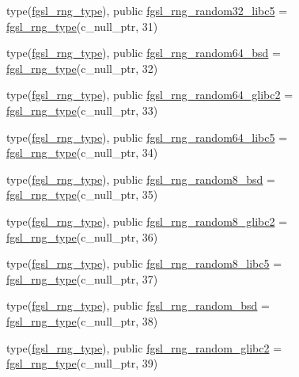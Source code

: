 \begin{DoxyCompactItemize}
type(\hyperlink{structfgsl_1_1fgsl__rng__type}{fgsl\-\_\-rng\-\_\-type}), public \hyperlink{classfgsl_a85c8b85216d7705c54a071e06a65d871}{fgsl\-\_\-rng\-\_\-random32\-\_\-libc5} = \hyperlink{structfgsl_1_1fgsl__rng__type}{fgsl\-\_\-rng\-\_\-type}(c\-\_\-null\-\_\-ptr, 31)
\item 
type(\hyperlink{structfgsl_1_1fgsl__rng__type}{fgsl\-\_\-rng\-\_\-type}), public \hyperlink{classfgsl_a4f1fadb8ae8e69bc97fa0ce10b8c2669}{fgsl\-\_\-rng\-\_\-random64\-\_\-bsd} = \hyperlink{structfgsl_1_1fgsl__rng__type}{fgsl\-\_\-rng\-\_\-type}(c\-\_\-null\-\_\-ptr, 32)
\item 
type(\hyperlink{structfgsl_1_1fgsl__rng__type}{fgsl\-\_\-rng\-\_\-type}), public \hyperlink{classfgsl_afa30a9f9486fc4a3ebc5c98fdf7c2734}{fgsl\-\_\-rng\-\_\-random64\-\_\-glibc2} = \hyperlink{structfgsl_1_1fgsl__rng__type}{fgsl\-\_\-rng\-\_\-type}(c\-\_\-null\-\_\-ptr, 33)
\item 
type(\hyperlink{structfgsl_1_1fgsl__rng__type}{fgsl\-\_\-rng\-\_\-type}), public \hyperlink{classfgsl_a5d485fce442bdf380a13906f23f519cb}{fgsl\-\_\-rng\-\_\-random64\-\_\-libc5} = \hyperlink{structfgsl_1_1fgsl__rng__type}{fgsl\-\_\-rng\-\_\-type}(c\-\_\-null\-\_\-ptr, 34)
\item 
type(\hyperlink{structfgsl_1_1fgsl__rng__type}{fgsl\-\_\-rng\-\_\-type}), public \hyperlink{classfgsl_a03a999d95485529c23b1eeb38284dd6a}{fgsl\-\_\-rng\-\_\-random8\-\_\-bsd} = \hyperlink{structfgsl_1_1fgsl__rng__type}{fgsl\-\_\-rng\-\_\-type}(c\-\_\-null\-\_\-ptr, 35)
\item 
type(\hyperlink{structfgsl_1_1fgsl__rng__type}{fgsl\-\_\-rng\-\_\-type}), public \hyperlink{classfgsl_a6028caefc0e3a940d1ee57801f7fd438}{fgsl\-\_\-rng\-\_\-random8\-\_\-glibc2} = \hyperlink{structfgsl_1_1fgsl__rng__type}{fgsl\-\_\-rng\-\_\-type}(c\-\_\-null\-\_\-ptr, 36)
\item 
type(\hyperlink{structfgsl_1_1fgsl__rng__type}{fgsl\-\_\-rng\-\_\-type}), public \hyperlink{classfgsl_a2cce36d84f84109ec9e54bd0d252bbb3}{fgsl\-\_\-rng\-\_\-random8\-\_\-libc5} = \hyperlink{structfgsl_1_1fgsl__rng__type}{fgsl\-\_\-rng\-\_\-type}(c\-\_\-null\-\_\-ptr, 37)
\item 
type(\hyperlink{structfgsl_1_1fgsl__rng__type}{fgsl\-\_\-rng\-\_\-type}), public \hyperlink{classfgsl_a087022fa0d8a304cfb59e544a14d0a3c}{fgsl\-\_\-rng\-\_\-random\-\_\-bsd} = \hyperlink{structfgsl_1_1fgsl__rng__type}{fgsl\-\_\-rng\-\_\-type}(c\-\_\-null\-\_\-ptr, 38)
\item 
type(\hyperlink{structfgsl_1_1fgsl__rng__type}{fgsl\-\_\-rng\-\_\-type}), public \hyperlink{classfgsl_aa5b21e91890ada1ae4bef30981f67da1}{fgsl\-\_\-rng\-\_\-random\-\_\-glibc2} = \hyperlink{structfgsl_1_1fgsl__rng__type}{fgsl\-\_\-rng\-\_\-type}(c\-\_\-null\-\_\-ptr, 39)

\end{DoxyCompactItemize}
